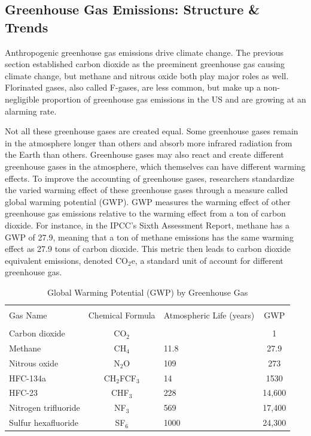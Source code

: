 \subsection{Greenhouse Gas Emissions: Structure \& Trends}

Anthropogenic greenhouse gas emissions drive climate change. The previous section established carbon dioxide as the preeminent greenhouse gas causing climate change, but methane and nitrous oxide both play major roles as well. Florinated gases, also called F-gases, are less common, but make up a non-negligible proportion of greenhouse gas emissions in the US and are growing at an alarming rate.

Not all these greenhouse gases are created equal. Some greenhouse gases remain in the atmosphere longer than others and absorb more infrared radiation from the Earth than others. Greenhouse gases may also react and create different greenhouse gases in the atmosphere, which themselves can have different warming effects. To improve the accounting of greenhouse gases, researchers standardize the varied warming effect of these greenhouse gases through a measure called global warming potential (GWP). GWP measures the warming effect of other greenhouse gas emissions relative to the warming effect from a ton of carbon dioxide. For instance, in the IPCC's Sixth Assessment Report, methane has a GWP of 27.9, meaning that a ton of methane emissions has the same warming effect as 27.9 tons of carbon dioxide. This metric then leads to carbon dioxide equivalent emissions, denoted CO$_2$e, a standard unit of account for different greenhouse gas.

\begin{table}
\centering
\caption{Global Warming Potential (GWP) by Greenhouse Gas \label{gwptable}}
\begin{tabular}{l c C{3cm} c}
	\hline\\[-1.8ex]
	Gas Name & Chemical Formula & Atmospheric Life (years) & GWP\\ 
	\hline\\[-1.8ex]
	Carbon dioxide & CO$_2$ &  & 1 \\
	Methane & CH$_4$ & 11.8 & 27.9\\
	Nitrous oxide & N$_2$O & 109 & 273\\
	HFC-134a & CH$_2$FCF$_3$ & 14 & 1530\\ 
	HFC-23 & CHF$_3$ & 228 & 14,600\\
	Nitrogen trifluoride & NF$_3$ & 569 & 17,400\\
	Sulfur hexafluoride & SF$_6$ & 1000 & 24,300\\
	\hline
\end{tabular}\\
\vspace{.6em}
\end{table}

